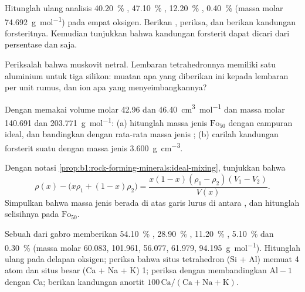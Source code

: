 \begin{exercise}[$\star\star$]\label{exo:b1:rock-forming-minerals:7}
Hitunglah ulang analisis  \qty{40.20}{\percent}
, \qty{47.10}{\percent} , \qty{12.20}{\percent} ,
\qty{0.40}{\percent}  (massa molar 
\qty{74.692}{g.mol^{-1}}) pada empat oksigen.
Berikan , periksa, dan berikan kandungan forsteritnya.
Kemudian tunjukkan bahwa kandungan forsterit dapat dicari dari persentase  dan  saja.
\end{exercise}

\begin{exercise}[$\star\star$]\label{exo:b1:rock-forming-minerals:8}
Periksalah bahwa muskovit  netral. Lembaran tetrahedronnya memiliki satu aluminium untuk tiga silikon: muatan apa yang diberikan ini kepada lembaran per unit rumus, dan ion apa yang menyeimbangkannya?
\end{exercise}

\begin{exercise}[$\star\star$]\label{exo:b1:rock-forming-minerals:9}
Dengan memakai volume molar \num{42.96} dan \qty{46.40}{cm^3.mol^{-1}} dan massa molar \num{140.691} dan \qty{203.771}{g.mol^{-1}}: (a) hitunglah massa jenis $\text{Fo}_{50}$ dengan campuran ideal, dan bandingkan dengan rata-rata massa jenis ; (b) carilah kandungan forsterit suatu  dengan massa jenis \qty{3.600}{g.cm^{-3}}.
\end{exercise}

\begin{exercise}[$\star\star\star$]\label{exo:b1:rock-forming-minerals:10}
Dengan notasi \cref{prop:b1:rock-forming-minerals:ideal-mixing}, tunjukkan
bahwa
\[
  \rho(x) - \bigl(x\rho_1 + (1 - x)\rho_2\bigr) =
  \frac{x(1 - x)(\rho_1 - \rho_2)(V_1 - V_2)}{V(x)} .
\]
Simpulkan bahwa massa jenis  berada di atas garis lurus di antara , dan hitunglah selisihnya pada $\text{Fo}_{50}$.
\end{exercise}

\begin{exercise}[$\star\star\star$]\label{exo:b1:rock-forming-minerals:11}
Sebuah  dari gabro memberikan \qty{54.10}{\percent} ,
\qty{28.90}{\percent} , \qty{11.20}{\percent} ,
\qty{5.10}{\percent}  dan \qty{0.30}{\percent}  (massa molar
\num{60.083}, \num{101.961}, \num{56.077}, \num{61.979},
\qty{94.195}{g.mol^{-1}}). Hitunglah ulang pada delapan oksigen; periksa bahwa situs tetrahedron (Si + Al) memuat 4 atom dan situs besar (Ca + Na + K) 1; periksa  dengan membandingkan $\mathrm{Al} - 1$ dengan Ca; berikan kandungan anortit $100\,\mathrm{Ca}/(\mathrm{Ca} +
\mathrm{Na} + \mathrm{K})$.
\end{exercise}

